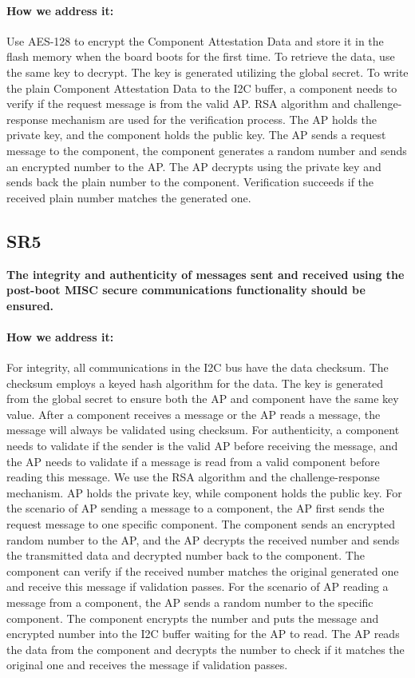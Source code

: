 \documentclass[11pt,oneside,onecolumn,letterpaper]{article}
\newcounter{alg}
\begin{document}
\paragraph{How we address it:}
Use AES-128 to encrypt the Component Attestation Data and store it in the flash memory when the board boots for the first time.
To retrieve the data,
use the same key to decrypt.
The key is generated utilizing the global secret.
To write the plain Component Attestation Data to the I2C buffer,
a component needs to verify if the request message is from the valid AP.
RSA algorithm and challenge-response mechanism are used for the verification process.
The AP holds the private key,
and the component holds the public key.
The AP sends a request message to the component,
the component generates a random number and sends an encrypted number to the AP.
The AP decrypts using the private key and sends back the plain number to the component.
Verification succeeds if the received plain number matches the generated one.

\subsection{SR5}
\textbf{The integrity and authenticity of messages sent and received using the post-boot MISC secure communications functionality should be ensured.}
\paragraph{How we address it:}
For integrity,
all communications in the I2C bus have the data checksum.
The checksum employs a keyed hash algorithm for the data.
The key is generated from the global secret to ensure both the AP and component have the same key value.
After a component receives a message or the AP reads a message,
the message will always be validated using checksum.
For authenticity,
a component needs to validate if the sender is the valid AP before receiving the message,
and the AP needs to validate if a message is read from a valid component before reading this message.
We use the RSA algorithm and the challenge-response mechanism.
AP holds the private key,
while component holds the public key.
For the scenario of AP sending a message to a component,
the AP first sends the request message to one specific component.
The component sends an encrypted random number to the AP,
and the AP decrypts the received number and sends the transmitted data and decrypted number back to the component.
The component can verify if the received number matches the original generated one and receive this message if validation passes.
For the scenario of AP reading a message from a component,
the AP sends a random number to the specific component.
The component encrypts the number and puts the message and encrypted number into the I2C buffer waiting for the AP to read.
The AP reads the data from the component and decrypts the number to check if it matches the original one and receives the message if validation passes.
\end{document}
